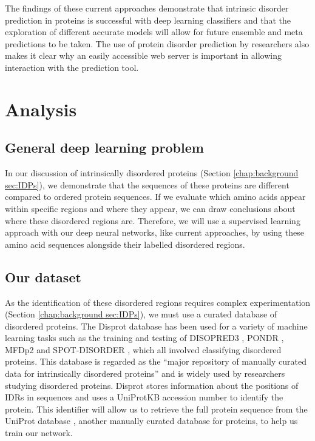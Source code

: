 \documentclass{l4proj}
\begin{document}
The findings of these current approaches demonstrate that intrinsic disorder prediction in proteins is successful with deep learning classifiers and that the exploration of different accurate models will allow for future ensemble and meta predictions to be taken. The use of protein disorder prediction by researchers also makes it clear why an easily accessible web server is important in allowing interaction with the prediction tool.


\chapter{Analysis}
\label{chap:analysis}

\section{General deep learning problem}

In our discussion of intrinsically disordered proteins (Section \ref{chap:background sec:IDPs}), we demonstrate that the sequences of these proteins are different compared to ordered protein sequences. If we evaluate which amino acids appear within specific regions and where they appear, we can draw conclusions about where these disordered regions are. Therefore, we will use a supervised learning approach with our deep neural networks, like current approaches, by using these amino acid sequences alongside their labelled disordered regions.  

\section{Our dataset}

As the identification of these disordered regions requires complex experimentation (Section \ref{chap:background sec:IDPs}), we must use a curated database of disordered proteins. The Disprot database \citep{disprot} has been used for a variety of machine learning tasks such as the training and testing of DISOPRED3 \citep{disopred3_paper}, PONDR \citep{Xue:10}, MFDp2 \citep{Mizianty:13} and SPOT-DISORDER \citep{Hanson:16}, which all involved classifying disordered proteins. This database is regarded as the “major repository of manually curated data for intrinsically disordered proteins” \citep{Quaglia:22} and is widely used by researchers studying disordered proteins. Disprot stores information about the positions of IDRs in sequences and uses a UniProtKB accession number to identify the protein. This identifier will allow us to retrieve the full protein sequence from the UniProt database \citep{uniprot:22}, another manually curated database for proteins, to help us train our network. 
\end{document}
